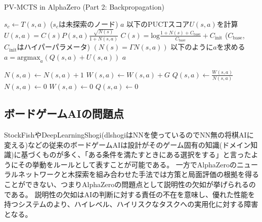 \begin{algorithm}
    \caption{PV-MCTS in AlphaZero (Part 2: Backpropagation)}
    \label{alg:mcts-2}
    \begin{algorithmic}[1]
                \State $s_c \gets T(s, a)$ ($s_c$は未探索のノード)
                \State {}
                \State \Return $a$
            \Else
                \State 以下のPUCTスコア$U(s, a)$を計算
                \State $U(s, a)= C(s)P(s, a)\frac{\sqrt{N(s)}}{1+N(s, a)}$
                \State $C(s)=\textrm{log}\frac{1+N(s)+C_{\textrm{base}}}{C_{\textrm{base}}}+C_{\textrm{init}}$
                \State($C_{\textrm{base}}$, $C_{\textrm{init}}$はハイパーパラメータ)
                \State $(N(s)=\Gamma N(s, a))$
                \State 以下のように$a$を求める
                \State $a = {\textrm{argmax}}_a (Q(s, a)+U(s, a))$
                \State \Return $a$
                
            \EndIf
        \EndFunction
                \State $N(s, a) \gets  N(s, a)+1$
                \State $W(s, a) \gets  W(s, a)+G$
                \State $Q(s, a) \gets \frac{W(s, a)}{N(s, a)}$
            \EndFor
        \EndFunction
                \State $N(s, a) \gets 0$
                \State $W(s, a) \gets 0$
                \State $Q(s, a) \gets 0$
            \EndFor
        \EndFunction
    \end{algorithmic}
\end{algorithm}


\subsection{ボードゲームAIの問題点}
StockFish\cite{StockFish}やDeepLearningShogi\cite{dlshogi}(dlshogiはNNを使っているのでNN無の将棋AIに変える)などの従来のボードゲームAIは設計がそのゲーム固有の知識(ドメイン知識)に基づくものが多く、「ある条件を満たすときにある選択をする」と言ったようにその挙動をルールとして表すことが可能である。
一方でAlphaZeroのニューラルネットワークと木探索を組み合わせた手法では方策と局面評価の根拠を得ることができない、つまりAlphaZeroの問題点として説明性の欠如が挙げられるのである。
説明性の欠如はAIの判断に対する責任の不在を意味し、優れた性能を持つシステムのより、ハイレベル、ハイリスクなタスクへの実用化に対する障害となる。



